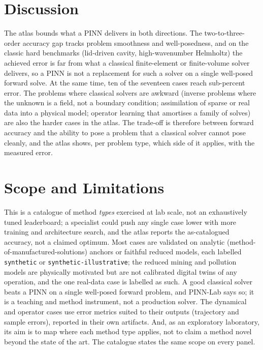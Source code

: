 \documentclass[journal]{IEEEtran}
\begin{document}
\section{Discussion}\label{sec:discuss}

The atlas bounds what a PINN delivers in both directions. The two-to-three-order accuracy gap tracks problem
smoothness and well-posedness, and on the classic hard benchmarks (lid-driven cavity, high-wavenumber Helmholtz)
the achieved error is far from what a classical finite-element or finite-volume solver delivers, so a PINN is not
a replacement for such a solver on a single well-posed forward solve. At the same time, ten of the seventeen
cases reach sub-percent error. The problems where classical solvers are awkward (inverse problems where the
unknown is a field, not a boundary condition; assimilation of sparse or real data into a physical model; operator
learning that amortises a family of solves) are also the harder cases in the atlas. The trade-off is therefore
between forward accuracy and the ability to pose a problem that a classical solver cannot pose cleanly, and the
atlas shows, per problem type, which side of it applies, with the measured error.

\section{Scope and Limitations}\label{sec:limits}

This is a catalogue of method \emph{types} exercised at lab scale, not an
exhaustively tuned leaderboard; a specialist could push any single case lower with more training and architecture
search, and the atlas reports the as-catalogued accuracy, not a claimed optimum. Most cases are validated on
analytic (method-of-manufactured-solutions) anchors or faithful reduced models, each labelled \texttt{synthetic}
or \texttt{synthetic-illustrative}; the reduced mining and pollution models are physically motivated but are not
calibrated digital twins of any operation, and the one real-data case is labelled as such. A good classical
solver beats a PINN on a single well-posed forward problem, and PINN-Lab says so; it is a teaching and method
instrument, not a production solver. The dynamical and operator cases use error metrics suited to their outputs
(trajectory and sample errors), reported in their own artifacts. And, as an exploratory laboratory, its aim is to
map where each method type applies, not to claim a method novel beyond the state of the art. The catalogue
states the same scope on every panel.
\end{document}
